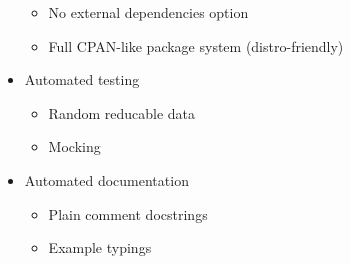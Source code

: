\begin{itemize}
  \begin{itemize}

  \item No external dependencies option

  \item Full CPAN-like package system (distro-friendly)

  \end{itemize}

\item Automated testing

  \begin{itemize}

  \item Random reducable data

  \item Mocking

  \end{itemize}

\item Automated documentation

  \begin{itemize}

  \item Plain comment docstrings

  \item Example typings

  \end{itemize}

\end{itemize}

